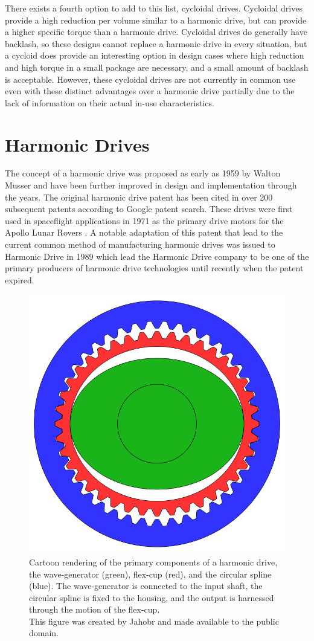 There exists a fourth option to add to this list, cycloidal drives. 
Cycloidal drives provide a high reduction per volume similar to a harmonic drive, but can provide a higher specific torque than a harmonic drive. 
Cycloidal drives do generally have backlash, so these designs cannot replace a harmonic drive in every situation, but a cycloid does provide an interesting option in design cases where high reduction and high torque in a small package are necessary, and a small amount of backlash is acceptable. 
However, these cycloidal drives are not currently in common use even with these distinct advantages over a harmonic drive partially due to the lack of information on their actual in-use characteristics. 

\section{Harmonic Drives} \label{intro:harmonic}

The concept of a harmonic drive was proposed as early as 1959 by Walton Musser \cite{ref:harmonic_original} and have been further improved in design and implementation through the years. The original harmonic drive patent has been cited in over 200 subsequent patents according to Google patent search. These drives were first used in spaceflight applications in 1971 as the primary drive motors for the Apollo Lunar Rovers \cite{ref:harmonic_apollo}. A notable adaptation of this patent that lead to the current common method of manufacturing harmonic drives was issued to Harmonic Drive in 1989 \cite{ref:harmonic_drive_co} which lead the Harmonic Drive company to be one of the primary producers of harmonic drive technologies until recently when the patent expired. 

\begin{figure}[h]
   \centering
   \includegraphics[width=0.3\linewidth]{fig/harmonic_blank}
   \caption{Cartoon rendering of the primary components of a harmonic drive, the wave-generator (green), flex-cup (red), and the circular spline (blue). The wave-generator is connected to the input shaft, the circular spline is fixed to the housing, and the output is harnessed through the motion of the flex-cup. \\
   This figure was created by Jahobr and made available to the public domain.}
   \label{fig:harmonic_cartoon}
\end{figure}

